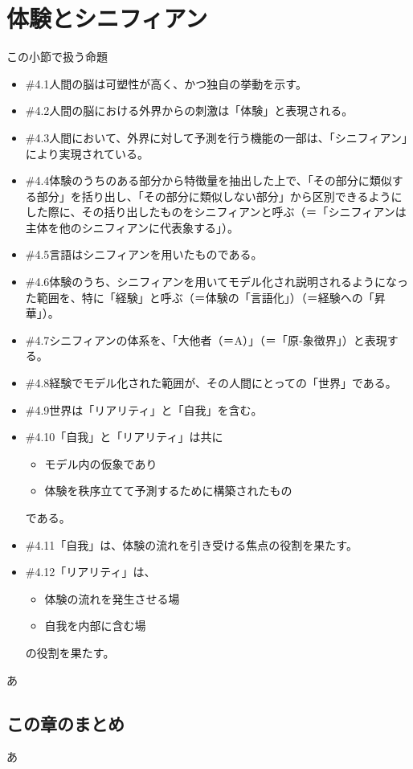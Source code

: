 \section{体験とシニフィアン}\label{ux4f53ux9a13ux3068ux30b7ux30cbux30d5ux30a3ux30a2ux30f3}

\begin{note}{この小節で扱う命題}
  \begin{itemize}
    \tightlist
    \item{\#4.1}人間の脳は可塑性が高く、かつ独自の挙動を示す。
    \item{\#4.2}人間の脳における外界からの刺激は「体験」と表現される。
    \item{\#4.3}人間において、外界に対して予測を行う機能の一部は、「シニフィアン」により実現されている。
    \item{\#4.4}体験のうちのある部分から特徴量を抽出した上で、「その部分に類似する部分」を括り出し、「その部分に類似しない部分」から区別できるようにした際に、その括り出したものをシニフィアンと呼ぶ（＝「シニフィアンは主体を他のシニフィアンに代表象する」）。
    \item{\#4.5}言語はシニフィアンを用いたものである。
    \item{\#4.6}体験のうち、シニフィアンを用いてモデル化され説明されるようになった範囲を、特に「経験」と呼ぶ（＝体験の「言語化」）（＝経験への「昇華」）。
    \item{\#4.7}シニフィアンの体系を、「大他者（＝A）」（＝「原‐象徴界」）と表現する。
    \item{\#4.8}経験でモデル化された範囲が、その人間にとっての「世界」である。
    \item{\#4.9}世界は「リアリティ」と「自我」を含む。
    \item{\#4.10}「自我」と「リアリティ」は共に
      \begin{itemize}
        \tightlist
        \item モデル内の仮象であり
        \item 体験を秩序立てて予測するために構築されたもの
      \end{itemize}である。
    \item{\#4.11}「自我」は、体験の流れを引き受ける焦点の役割を果たす。
    \item{\#4.12}「リアリティ」は、
      \begin{itemize}
        \tightlist
        \item 体験の流れを発生させる場
        \item 自我を内部に含む場
      \end{itemize}の役割を果たす。
  \end{itemize}
\end{note}

あ

\subsection{この章のまとめ}\label{ux3053ux306eux7ae0ux306eux307eux3068ux3081}

あ
